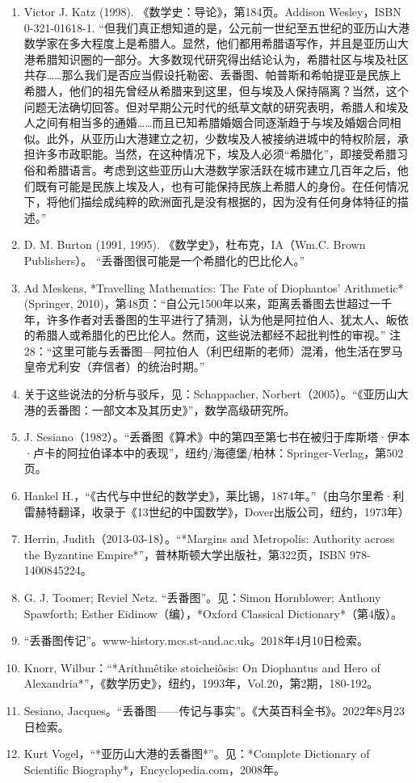 \begin{enumerate}
\item Victor J. Katz (1998). 《数学史：导论》，第184页。Addison Wesley，ISBN 0-321-01618-1.  
“但我们真正想知道的是，公元前一世纪至五世纪的亚历山大港数学家在多大程度上是希腊人。显然，他们都用希腊语写作，并且是亚历山大港希腊知识圈的一部分。大多数现代研究得出结论认为，希腊社区与埃及社区共存……那么我们是否应当假设托勒密、丢番图、帕普斯和希帕提亚是民族上希腊人，他们的祖先曾经从希腊来到这里，但与埃及人保持隔离？当然，这个问题无法确切回答。但对早期公元时代的纸草文献的研究表明，希腊人和埃及人之间有相当多的通婚……而且已知希腊婚姻合同逐渐趋于与埃及婚姻合同相似。此外，从亚历山大港建立之初，少数埃及人被接纳进城中的特权阶层，承担许多市政职能。当然，在这种情况下，埃及人必须“希腊化”，即接受希腊习俗和希腊语言。考虑到这些亚历山大港数学家活跃在城市建立几百年之后，他们既有可能是民族上埃及人，也有可能保持民族上希腊人的身份。在任何情况下，将他们描绘成纯粹的欧洲面孔是没有根据的，因为没有任何身体特征的描述。”
\item D. M. Burton (1991, 1995). 《数学史》，杜布克，IA（Wm.C. Brown Publishers）。  
“丢番图很可能是一个希腊化的巴比伦人。”
\item Ad Meskens, *Travelling Mathematics: The Fate of Diophantos' Arithmetic* (Springer, 2010)，第48页：“自公元1500年以来，距离丢番图去世超过一千年，许多作者对丢番图的生平进行了猜测，认为他是阿拉伯人、犹太人、皈依的希腊人或希腊化的巴比伦人。然而，这些说法都经不起批判性的审视。” 注28：“这里可能与丢番图—阿拉伯人（利巴纽斯的老师）混淆，他生活在罗马皇帝尤利安（弃信者）的统治时期。”  
\item 关于这些说法的分析与驳斥，见：Schappacher, Norbert（2005）。“《亚历山大港的丢番图：一部文本及其历史》”，数学高级研究所。
\item J. Sesiano（1982）。“丢番图《算术》中的第四至第七书在被归于库斯塔·伊本·卢卡的阿拉伯译本中的表现”，纽约/海德堡/柏林：Springer-Verlag，第502页。  
\item Hankel H.，“《古代与中世纪的数学史》，莱比锡，1874年。”（由乌尔里希·利雷赫特翻译，收录于《13世纪的中国数学》，Dover出版公司，纽约，1973年）  
\item Herrin, Judith（2013-03-18）。“*Margins and Metropolis: Authority across the Byzantine Empire*”，普林斯顿大学出版社，第322页，ISBN 978-1400845224。  
\item G. J. Toomer; Reviel Netz. “丢番图”。见：Simon Hornblower; Anthony Spawforth; Esther Eidinow（编），*Oxford Classical Dictionary*（第4版）。  
\item “丢番图传记”。www-history.mcs.st-and.ac.uk。2018年4月10日检索。  
\item Knorr, Wilbur：“*Arithmêtike stoicheiôsis: On Diophantus and Hero of Alexandria*”，《数学历史》，纽约，1993年，Vol.20，第2期，180-192。  
\item Sesiano, Jacques。“丢番图——传记与事实”。《大英百科全书》。2022年8月23日检索。  
\item Kurt Vogel，“*亚历山大港的丢番图*”。见：*Complete Dictionary of Scientific Biography*，Encyclopedia.com，2008年。
\end{enumerate}
